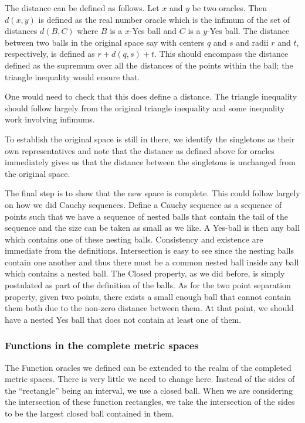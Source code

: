 \documentclass[12pt]{article}
\theoremstyle{remark}
\begin{document}
The distance can be defined as follows. Let $x$ and $y$ be two oracles. Then $d(x,y)$ is defined as the real number oracle which is the infimum of the set of distances $d(B, C)$ where $B$ is a $x$-Yes ball and $C$ is a $y$-Yes ball. The distance between two balls in the original space say with centers $q$ and $s$ and radii $r$ and $t$, respectively, is defined as $r + d(q,s) + t$. This should encompass the distance defined as the supremum over all the distances of the points within the ball; the triangle inequality would ensure that.  

One would need to check that this does define a distance. The triangle inequality should follow largely from the original triangle inequality and some inequality work involving infimums. 

To establish the original space is still in there, we identify the singletons as their own representatives and note that the distance as defined above for oracles immediately gives us that the distance between the singletons is unchanged from the original space. 

The final step is to show that the new space is complete. This could follow largely on how we did Cauchy sequences. Define a Cauchy sequence as a sequence of points such that we have a sequence of nested balls that contain the tail of the sequence and the size can be taken as small as we like. A Yes-ball is then any ball which contains one of these nesting balls. Consistency and existence are immediate from the definitions. Intersection is easy to see since the nesting balls contain one another and thus there must be a common nested ball inside any ball which contains a nested ball. The Closed property, as we did before, is simply postulated as part of the definition of the balls. As for the two point separation property, given two points, there exists a small enough ball that cannot contain them both due to the non-zero distance between them. At that point, we should have a nested Yes ball that does not contain at least one of them. 

\subsubsection{Functions in the complete metric spaces}

The Function oracles we defined can be extended to the realm of the completed metric spaces. There is very little we need to change here. Instead of the sides of the ``rectangle'' being an interval, we use a closed ball. When we are considering the intersection of these function rectangles, we take the intersection of the sides to be the largest closed ball contained in them. 
\end{document}
